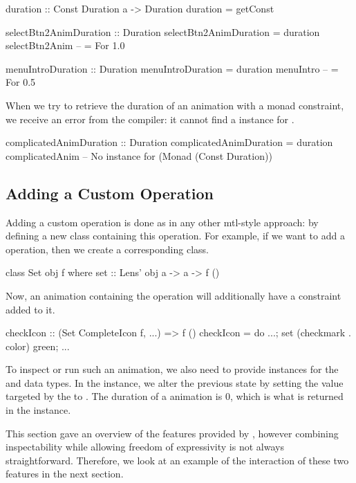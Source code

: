 \begin{code}
duration :: Const Duration a -> Duration
duration = getConst

selectBtn2AnimDuration :: Duration
selectBtn2AnimDuration = duration selectBtn2Anim -- = For 1.0

menuIntroDuration :: Duration
menuIntroDuration = duration menuIntro -- = For 0.5
\end{code}

When we try to retrieve the duration of an animation with a monad constraint, we receive an error from the compiler: it cannot find a  instance for .

\begin{spec}
complicatedAnimDuration :: Duration
complicatedAnimDuration = duration complicatedAnim
-- No instance for (Monad (Const Duration))
\end{spec}

\subsection{Adding a Custom Operation}

Adding a custom operation is done as in any other mtl-style approach: by defining a new class containing this operation. For example, if we want to add a  operation, then we create a corresponding  class.

\begin{code}
class Set obj f where set :: Lens' obj a -> a -> f ()
\end{code}

Now, an animation containing the  operation will additionally have a  constraint added to it.

\begin{code}
checkIcon :: (Set CompleteIcon f, ...) => f ()
checkIcon = do ...; set (checkmark . color) green; ...
\end{code}

To inspect or run such an animation, we also need to provide instances for the  and  data types. In the  instance, we alter the previous state by setting the value targeted by the  to . The duration of a  animation is 0, which is what is returned in the  instance.


This section gave an overview of the features provided by \dsl{}, however combining inspectability while allowing freedom of expressivity is not always straightforward. Therefore, we look at an example of the interaction of these two features in the next section.
